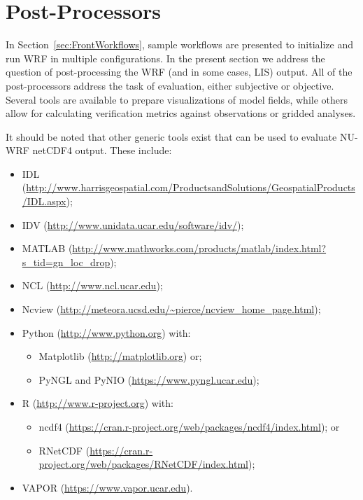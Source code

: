 \section{Post-Processors}
\label{sec:PostProc}

In Section~\ref{sec:FrontWorkflows}, sample workflows are presented to 
initialize and run WRF in multiple configurations. In the present section 
we address the question of post-processing the WRF (and in some cases, LIS) 
output. All of the post-processors address the task of evaluation, either 
subjective or objective. Several tools are available to prepare visualizations
of model fields, while others allow for calculating verification metrics 
against observations or gridded analyses. 

It should be noted that other generic tools exist that can be used to
evaluate NU-WRF netCDF4 output. These include:

\begin{itemize}
  \item IDL (\url{http://www.harrisgeospatial.com/ProductsandSolutions/GeospatialProducts/IDL.aspx});
  \item IDV (\url{http://www.unidata.ucar.edu/software/idv/});
  \item MATLAB (\url{http://www.mathworks.com/products/matlab/index.html?s_tid=gn_loc_drop});
  \item NCL (\url{http://www.ncl.ucar.edu});
  \item Ncview (\url{http://meteora.ucsd.edu/~pierce/ncview\_home\_page.html});
  \item Python (\url{http://www.python.org}) with:
    \begin{itemize}
    \item Matplotlib (\url{http://matplotlib.org}) or;
    \item PyNGL and PyNIO (\url{https://www.pyngl.ucar.edu});
    \end{itemize}
  \item R (\url{http://www.r-project.org}) with:
    \begin{itemize}
    \item ncdf4 (\url{https://cran.r-project.org/web/packages/ncdf4/index.html}); or
    \item RNetCDF (\url{https://cran.r-project.org/web/packages/RNetCDF/index.html}); 
    \end{itemize}
  \item VAPOR (\url{https://www.vapor.ucar.edu}).
\end{itemize}

